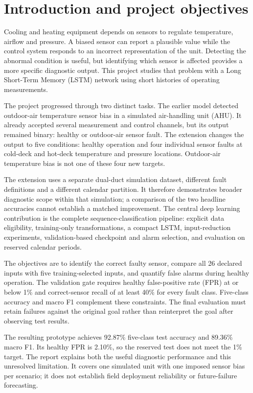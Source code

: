 \section{Introduction and project objectives}
Cooling and heating equipment depends on sensors to regulate temperature, airflow and pressure. A biased sensor can report a plausible value while the control system responds to an incorrect representation of the unit. Detecting the abnormal condition is useful, but identifying which sensor is affected provides a more specific diagnostic output. This project studies that problem with a Long Short-Term Memory (LSTM) network using short histories of operating measurements.

The project progressed through two distinct tasks. The earlier model detected outdoor-air temperature sensor bias in a simulated air-handling unit (AHU). It already accepted several measurement and control channels, but its output remained binary: healthy or outdoor-air sensor fault. The extension changes the output to five conditions: healthy operation and four individual sensor faults at cold-deck and hot-deck temperature and pressure locations. Outdoor-air temperature bias is not one of these four new targets.

The extension uses a separate dual-duct simulation dataset, different fault definitions and a different calendar partition. It therefore demonstrates broader diagnostic scope within that simulation; a comparison of the two headline accuracies cannot establish a matched improvement. The central deep learning contribution is the complete sequence-classification pipeline: explicit data eligibility, training-only transformations, a compact LSTM, input-reduction experiments, validation-based checkpoint and alarm selection, and evaluation on reserved calendar periods.

The objectives are to identify the correct faulty sensor, compare all 26 declared inputs with five training-selected inputs, and quantify false alarms during healthy operation. The validation gate requires healthy false-positive rate (FPR) at or below 1\% and correct-sensor recall of at least 40\% for every fault class. Five-class accuracy and macro F1 complement these constraints. The final evaluation must retain failures against the original goal rather than reinterpret the goal after observing test results.

The resulting prototype achieves 92.87\% five-class test accuracy and 89.36\% macro F1. Its healthy FPR is 2.10\%, so the reserved test does not meet the 1\% target. The report explains both the useful diagnostic performance and this unresolved limitation. It covers one simulated unit with one imposed sensor bias per scenario; it does not establish field deployment reliability or future-failure forecasting.

